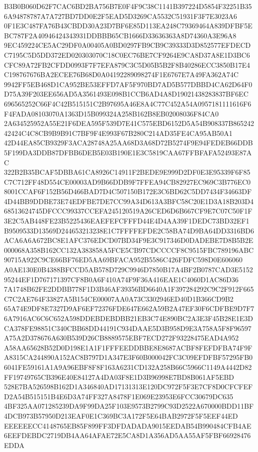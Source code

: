 \documentclass[UTF8,fontset=fandol,zihao=-4,a4paper]{ctexart}
\begin{document}
{{B3B0B060D62F7CAC6BD2BA756B7E0F4F9C38C1141B397224D5854F32251B356A94878787A7A727BD7DD0E2F5EAD5D3269CA5532C51931F3F7E3023A6
0F1E3C487FA76B43CBDD30A23D7BF6E85D113EA248C79369464A839DFBF5EBC787F2A40946424343931DDBBB65CB1666D33636363A8D74360A3E96A8
9EC459224CE5AC29DF0A00405A0BD0297FB9CB9C39333D3D852577EFDECDC7195C5D5DD372ED020303070C18C0EC76BE7CF9264E9CA8D37A8E1D3BC6
CFC89A72FB2CFDD0993F7F7EFA879C3C5D05B5B2F8B40286ECC3850B17E4C198767676BA2ECEE76B68D0A04192289098274F1E6767E7A49FA362A74C
9942FF5EB468D1CA952BE53EFFD7AF5F970BD7AD5B577DBBD4CA62D64F0D75A39F203EE656AD5A3561493E098B1CCB6AD4A8D19021438283837BF6EC
696565252C66F4C42B515151C2B97695A46E8A4C77C452A54A0957181111616F6F4FADA08103070A1363D15B099324A258B162B8EB02008036F84CA0
2A634525952A55E21F6DEA595F539D7E41C575EBD6152D5A54B908337B86524242424C4C8CB9B9B91C7BF9F4E993F67B280C214AD35FE4CA95AB50A1
42D44EA85CB9329F3ACA28748A25AA68D3A68D72B5274F9E94FEDEB66DDB5F199DA3DDB87DFBB6DEB5E03B190E1E3C5819CAA67FFBFAFA52493E87AC
322B2B35BCAF5DBBA61CA8926C14911F2BEDE9E999D2DF0E3E95339F6F85C7C712FF48D554CE00003AD9B66DDB9F7FFEA94CB82927EC969C3B776EC0
8001CCAF6F152B56D466BAD7D4C507150B172E3C6BD62C5DD7434F34663DF4D44BB9DDBE73E74EDFBE7DE7CC99A34D613A3BFC58C20E1D3A18B203D4
68513624745DFCCC99337CCEFA245120519A26CED6D6B667CF9E7C07C50F1F3E2C5AB448FE23B5225436EAEFEFCFFFD44E4D4AA39F1DEDC73BD32EF1
B9509533D13569D244653213238E1C7FFFFEFDE2C58BA74D9BA64DD3316BD6ACA6A6A672BC8E1AFC376EDCD07BD34F9E3C917346D0DADEBE7D8B5B2E
000068A358B162CC132A383858A5FCE5CB97CDCCCCF8C9515FBC789196ABC90715A922C9CE66BF76ED5AA69BFACA952B5586C426FDFC598D0E606060
A0AE130E0B4388BFCCD5AB578D729C9946D7850B17A4BF2B0787CAD3E515295244EF1D767171397CF8B0A6F410A74F9F36A416EAE1C4060D1AC86D36
7A1748B62FE2DDBB778F1D3B46AF39356BD6640A1F397284292C9C2F912F665C7C2AE764F33827A5B154CE00007AA0A73C3302946ED40D1B366CD9B2
65A74E9DF8E7327D9AF6EF72376FDE647E662A59B2A47EF30F6CDFBE9D7F76A7916AC6C6C652A598DDEBDEBDBB21EB3C74E890BC2A3E3F45B28E1E3D
CA378FE98851C340CBB68DD44191C934DAAE5D3B958D9E3A758A5F8F96597A75A2D378676A630B539D26CB8889575EBF7ECD272F93228475EAD4A952
A58AA65628B52D0D198E1A1F1FFFEEDDBBE8E8687ACBF8FEFDFBA74F9FA8315CA244890A152AC8B797D1A347E3F60B000042FC3C09EFDFBF57295FB0
6041FE59161A1A9A96EBF8F8F163A6231CD132A258B66C5966C1149A4442D82FF19749765CB396E40E84127A4DA03F8E1D3B96998E7BD8B061AF5EBD
528E7BA526598B162D1A346840AD17131313E120DC972F5F3E7CF8D0CFCFEFD2A54B515151B4E6D3A74FF327A8478F1E069E23953E6FCC30679DC635
4BF325AA071285239DA9F99DA25F103E9573B2799C93D2522A670000BDD11BF4DCB973B57950D213EAF0E1C369BC3A172F5E64BAB2972F5F5EEF44ED
EEEEEECC4148765EB85F899FF3DFDADADA9015EEDAB54B990484CFB4AE6EEFDEBDC2719DB4AA64AFAE72E5CA8D1A356AD5AA55AF5FBF66928476EDDA
}}
\end{document}
